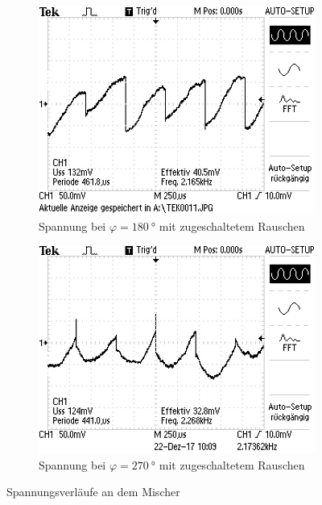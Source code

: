\begin{figure}[h!]
 \centering
 \begin{subfigure}{0.48\textwidth}
  \centering
  \includegraphics[width=\textwidth]{180gradrausch.JPG}
  \caption{Spannung bei $\varphi=\SI{180}{°}$ mit zugeschaltetem Rauschen}
  \label{fig:180gradrausch}
 \end{subfigure}
 \begin{subfigure}{0.48\textwidth}
  \centering
  \includegraphics[width=\textwidth]{270gradrausch.JPG}
  \caption{Spannung bei $\varphi=\SI{270}{°}$ mit zugeschaltetem Rauschen}
  \label{fig:270gradrausch}
 \end{subfigure}
 \caption{Spannungsverläufe an dem Mischer}
 \label{fig:180270}
\end{figure}
